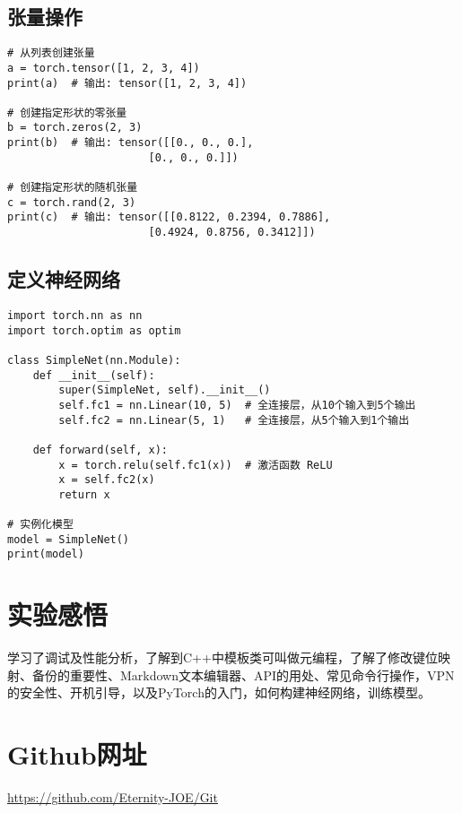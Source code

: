 \documentclass[a4paper, 12pt]{article}
\begin{document}
\subsection{张量操作}
\begin{lstlisting}
# 从列表创建张量
a = torch.tensor([1, 2, 3, 4])
print(a)  # 输出: tensor([1, 2, 3, 4])

# 创建指定形状的零张量
b = torch.zeros(2, 3)
print(b)  # 输出: tensor([[0., 0., 0.],
                      [0., 0., 0.]])

# 创建指定形状的随机张量
c = torch.rand(2, 3)
print(c)  # 输出: tensor([[0.8122, 0.2394, 0.7886],
                      [0.4924, 0.8756, 0.3412]])

\end{lstlisting}
\subsection{定义神经网络}
\begin{lstlisting}
import torch.nn as nn
import torch.optim as optim

class SimpleNet(nn.Module):
    def __init__(self):
        super(SimpleNet, self).__init__()
        self.fc1 = nn.Linear(10, 5)  # 全连接层，从10个输入到5个输出
        self.fc2 = nn.Linear(5, 1)   # 全连接层，从5个输入到1个输出

    def forward(self, x):
        x = torch.relu(self.fc1(x))  # 激活函数 ReLU
        x = self.fc2(x)
        return x

# 实例化模型
model = SimpleNet()
print(model)

\end{lstlisting}
\newpage
\section{实验感悟}
学习了调试及性能分析，了解到C++中模板类可叫做元编程，了解了修改键位映射、备份的重要性、Markdown文本编辑器、API的用处、常见命令行操作，VPN的安全性、开机引导，以及PyTorch的入门，如何构建神经网络，训练模型。
\section{Github网址}
\href{https://github.com/Eternity-JOE/Git}{https://github.com/Eternity-JOE/Git}
\end{document}
